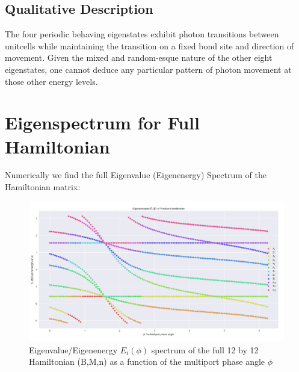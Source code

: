 \subsection{Qualitative Description}
The four periodic behaving eigenstates exhibit photon transitions between unitcells while maintaining the transition on a fixed bond site and direction of movement. \newline
Given the mixed and random-esque nature of the other eight eigenstates, one cannot deduce any particular pattern of photon movement at those other energy levels. 
\section{Eigenspectrum for Full Hamiltonian}
Numerically we find the full Eigenvalue (Eigenenergy) Spectrum of the Hamiltonian matrix:
\begin{figure}[H]
    \centering
    \includegraphics[scale=0.4]{2_Body/Figures/eig_spec_full.png}
    \caption{Eigenvalue/Eigenenergy $E_{i}(\phi)$ spectrum of the full 12 by 12 Hamiltonian (B,M,n) as a function of the multiport phase angle $\phi$}
    \label{fig:my_label}
\end{figure}
